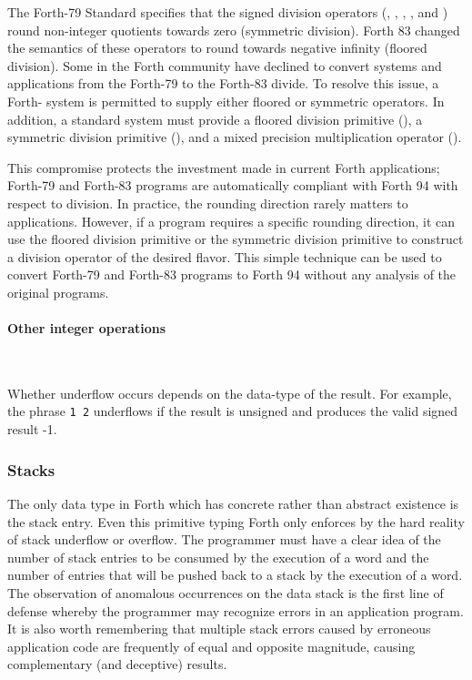 The Forth-79 Standard specifies that the signed division operators
(\word{/}, , , , and \word{*/})
round non-integer quotients towards zero (symmetric division).
Forth 83 changed the semantics of these operators to round towards
negative infinity (floored division). Some in the Forth community
have declined to convert systems and applications from the Forth-79
to the Forth-83 divide.  To resolve this issue, a Forth-\snapshot{} system
is permitted to supply either floored or symmetric operators. In
addition, a standard system must provide a floored division primitive
(), a symmetric division primitive (), and
a mixed precision multiplication operator ().

This compromise protects the investment made in current Forth
applications; Forth-79 and Forth-83 programs are automatically
compliant with Forth 94 with respect to division. In practice, the
rounding direction rarely matters to applications. However, if a
program requires a specific rounding direction, it can use the
floored division primitive  or the symmetric division
primitive  to construct a division operator of the
desired flavor. This simple technique can be used to convert Forth-79
and Forth-83 programs to Forth 94 without any analysis of the
original programs.

\paragraph{Other integer operations} ~ %

Whether underflow occurs depends on the data-type of the result. For
example, the phrase \texttt{1 2} \word{-} underflows if the result is
unsigned and produces the valid signed result -1.


\subsubsection{Stacks} %

The only data type in Forth which has concrete rather than abstract
existence is the stack entry. Even this primitive typing Forth only
enforces by the hard reality of stack underflow or overflow. The
programmer must have a clear idea of the number of stack entries to
be consumed by the execution of a word and the number of entries that
will be pushed back to a stack by the execution of a word. The
observation of anomalous occurrences on the data stack is the first
line of defense whereby the programmer may recognize errors in an
application program. It is also worth remembering that multiple stack
errors caused by erroneous application code are frequently of equal
and opposite magnitude, causing complementary (and deceptive) results.

